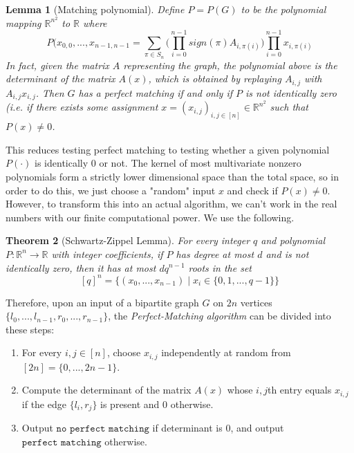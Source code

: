 \documentclass[a4paper, 12pt]{report}
\newtheorem{theorem}{Theorem}[section]
\newtheorem{lemma}[theorem]{Lemma}
\theoremstyle{remark}
\theoremstyle{definition}
\begin{document}
\begin{lemma}[Matching polynomial]
Define $P = P(G)$ to be the polynomial mapping $\mathbb{R}^{n^2}$ to $\mathbb{R}$ where 
\[P(x_{0, 0}, ..., x_{n-1, n-1} = \sum_{\pi \in S_n} \bigg( \prod_{i=0}^{n-1} sign(\pi) A_{i, \pi(i)} \bigg) \prod_{i=0}^{n-1} x_{i, \pi(i)}\]
In fact, given the matrix $A$ representing the graph, the polynomial above is the determinant of the matrix $A(x)$, which is obtained by replaying $A_{i, j}$ with $A_{i, j} x_{i, j}$. Then $G$ has a perfect matching if and only if $P$ is not identically zero (i.e. if there exists some assignment $x = (x_{i, j})_{i, j \in [n]} \in \mathbb{R}^{n^2}$ such that $P(x) \neq 0$. 
\end{lemma}
This reduces testing perfect matching to testing whether a given polynomial $P(\cdot)$ is identically $0$ or not. The kernel of most multivariate nonzero polynomials form a strictly lower dimensional space than the total space, so in order to do this, we just choose a "random" input $x$ and check if $P(x) \neq 0$. However, to transform this into an actual algorithm, we can't work in the real numbers with our finite computational power. We use the following. 

\begin{theorem}[Schwartz-Zippel Lemma]
For every integer $q$ and polynomial $P: \mathbb{R}^n \longrightarrow \mathbb{R}$ with integer coefficients, if $P$ has degree at most $d$ and is not identically zero, then it has at most $d q^{n-1}$ roots in the set 
\[[q]^n = \big\{(x_0, ..., x_{n-1}) \;|\; x_i \in \{0, 1, ..., q-1\}\big\}\]
\end{theorem}

Therefore, upon an input of a bipartite graph $G$ on $2n$ vertices $\{l_0, ..., l_{n-1}, r_0, ..., r_{n-1}\}$, the \textit{Perfect-Matching algorithm} can be divided into these steps: 
\begin{enumerate}
    \item For every $i, j \in [n]$, choose $x_{i, j}$ independently at random from $[2n] = \{0, ..., 2n-1\}$. 
    \item Compute the determinant of the matrix $A(x)$ whose $i, j$th entry equals $x_{i, j}$ if the edge $\{l_i, r_j\}$ is present and $0$ otherwise. 
    \item Output $\texttt{no perfect matching}$ if determinant is $0$, and output $\texttt{perfect matching}$ otherwise. 
\end{enumerate}
\end{document}
